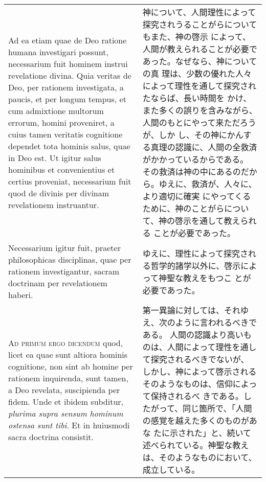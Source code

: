 \documentclass[10pt]{jsarticle} %
\begin{document}
\begin{longtable}{p{21em}p{21em}}
\\





Ad ea etiam quae de Deo ratione
humana investigari possunt, necessarium fuit hominem instrui revelatione
divina. Quia veritas de Deo, per rationem investigata, a paucis, et per
longum tempus, et cum admixtione multorum errorum, homini proveniret, a
cuius tamen veritatis cognitione dependet tota hominis salus, quae in
Deo est. Ut igitur salus hominibus et convenientius et certius
proveniat, necessarium fuit quod de divinis per divinam revelationem
instruantur. 


&

神について、人間理性によって探究されうることがらについてもまた、神の啓示
 によって、人間が教えられることが必要であった。なぜなら、神についての真
 理は、少数の優れた人々によって理性を通して探究されたならば、長い時間を
 かけ、また多くの誤りを含みながら、人間のもとにやって来ただろうが、しか
 し、その神にかんする真理の認識に、人間の全救済がかかっているからである。
 その救済は神の中にあるのだから。ゆえに、救済が、人々に、より適切に確実
 にやってくるために、神のことがらについて、神の啓示を通して教えられる
 ことが必要であった。


\\




Necessarium igitur fuit, praeter philosophicas disciplinas,
quae per rationem investigantur, sacram doctrinam per revelationem
haberi.

&

ゆえに、理性によって探究される哲学的諸学以外に、啓示によって神聖な教えをもつこ
 とが必要であった。


\\



{\scshape Ad primum ergo dicendum} quod, licet ea quae sunt altiora
hominis cognitione, non sint ab homine per rationem inquirenda, sunt
tamen, a Deo revelata, suscipienda per fidem. Unde et ibidem subditur,
{\itshape plurima supra sensum hominum ostensa sunt tibi}. Et in
huiusmodi sacra doctrina consistit.

&

第一異論に対しては、それゆえ、次のように言われるべきである。
人間の認識より高いものは、人間によって理性を通して探究されるべきでないが、
 しかし、神によって啓示されるそのようなものは、信仰によって保持されるべ
 きである。したがって、同じ箇所で、「人間の感覚を越えた多くのものがあな
 たに示された」と、続いて述べられている。神聖な教えは、そのようなものにおいて、
 成立している。


\end{longtable}
\end{document}

